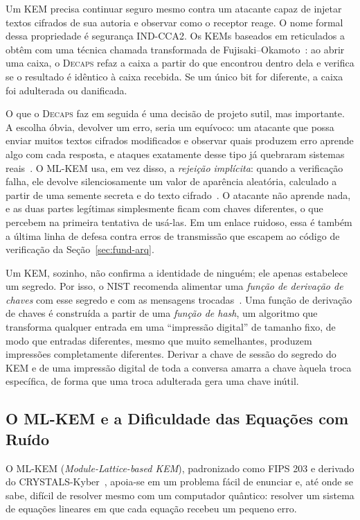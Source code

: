Um KEM precisa continuar seguro mesmo contra um atacante capaz de injetar
textos cifrados de sua autoria e observar como o receptor reage. O nome formal
dessa propriedade é segurança IND-CCA2. Os KEMs baseados em reticulados a
obtêm com uma técnica chamada transformada de
Fujisaki--Okamoto~\cite{fujisaki1999,hofheinz2017fo}: ao abrir uma caixa, o
\textsc{Decaps} refaz a caixa a partir do que encontrou dentro dela e verifica
se o resultado é idêntico à caixa recebida. Se um único bit for diferente, a
caixa foi adulterada ou danificada.

O que o \textsc{Decaps} faz em seguida é uma decisão de projeto sutil, mas
importante. A escolha óbvia, devolver um erro, seria um equívoco: um atacante
que possa enviar muitos textos cifrados modificados e observar quais produzem
erro aprende algo com cada resposta, e ataques exatamente desse tipo já
quebraram sistemas reais~\cite{bleichenbacher1998}. O ML-KEM usa, em vez disso,
a \emph{rejeição implícita}: quando a verificação falha, ele devolve
silenciosamente um valor de aparência aleatória, calculado a partir de uma
semente secreta e do texto cifrado~\cite{fips203}. O atacante não aprende nada,
e as duas partes legítimas simplesmente ficam com chaves diferentes, o que
percebem na primeira tentativa de usá-las. Em um enlace ruidoso, essa é também
a última linha de defesa contra erros de transmissão que escapem ao código de
verificação da Seção~\ref{sec:fund-arq}.

Um KEM, sozinho, não confirma a identidade de ninguém; ele apenas estabelece um
segredo. Por isso, o NIST recomenda alimentar uma \emph{função de derivação de
chaves} com esse segredo e com as mensagens trocadas~\cite{sp800227}. Uma
função de derivação de chaves é construída a partir de uma \emph{função de
hash}, um algoritmo que transforma qualquer entrada em uma ``impressão
digital'' de tamanho fixo, de modo que entradas diferentes, mesmo que muito semelhantes, produzem 
impressões completamente diferentes. Derivar a chave de sessão do segredo do KEM e
de uma impressão digital de toda a conversa amarra a chave àquela troca
específica, de forma que uma troca adulterada gera uma chave inútil.

\subsection{O ML-KEM e a Dificuldade das Equações com Ruído}\label{sec:fund-mlkem}
O ML-KEM (\emph{Module-Lattice-based KEM}), padronizado como FIPS 203 e
derivado do CRYSTALS-Kyber~\cite{fips203,bos2018kyber}, apoia-se em um problema
fácil de enunciar e, até onde se sabe, difícil de resolver mesmo com um
computador quântico: resolver um sistema de equações lineares em que cada
equação recebeu um pequeno erro.

